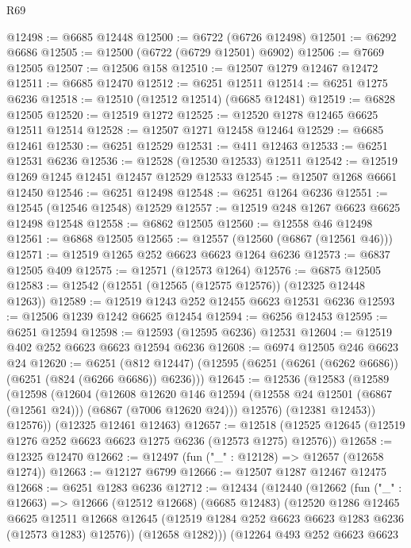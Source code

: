\begin{lexlean}{R69}
\begin{coremodule}
{@12498 := @6685 @12448
@12500 := @6722 (@6726 @12498)
@12501 := @6292 @6686
@12505 := @12500 (@6722 (@6729 @12501) @6902)
@12506 := @7669 @12505
@12507 := @12506 @158
@12510 := @12507 @1279 @12467 @12472
@12511 := @6685 @12470
@12512 := @6251 @12511
@12514 := @6251 @1275 @6236
@12518 := @12510 (@12512 @12514) (@6685 @12481)
@12519 := @6828 @12505
@12520 := @12519 @1272
@12525 := @12520 @1278 @12465 @6625 @12511 @12514
@12528 := @12507 @1271 @12458 @12464
@12529 := @6685 @12461
@12530 := @6251 @12529
@12531 := @411 @12463
@12533 := @6251 @12531 @6236
@12536 := @12528 (@12530 @12533) @12511
@12542 := @12519 @1269 @1245 @12451 @12457 @12529 @12533
@12545 := @12507 @1268 @6661 @12450
@12546 := @6251 @12498
@12548 := @6251 @1264 @6236
@12551 := @12545 (@12546 @12548) @12529
@12557 := @12519 @248 @1267 @6623 @6625 @12498 @12548
@12558 := @6862 @12505
@12560 := @12558 @46 @12498
@12561 := @6868 @12505
@12565 := @12557 (@12560 (@6867 (@12561 @46)))
@12571 := @12519 @1265 @252 @6623 @6623 @1264 @6236
@12573 := @6837 @12505 @409
@12575 := @12571 (@12573 @1264)
@12576 := @6875 @12505
@12583 := @12542 (@12551 (@12565 (@12575 @12576)) (@12325 @12448 @1263))
@12589 := @12519 @1243 @252 @12455 @6623 @12531 @6236
@12593 := @12506 @1239 @1242 @6625 @12454
@12594 := @6256 @12453
@12595 := @6251 @12594
@12598 := @12593 (@12595 @6236) @12531
@12604 := @12519 @402 @252 @6623 @6623 @12594 @6236
@12608 := @6974 @12505 @246 @6623 @24
@12620 := @6251
    (@812 @12447)
    (@12595 (@6251 (@6261 (@6262 @6686)) (@6251 (@824 (@6266 @6686)) @6236)))
@12645 := @12536
    (@12583
      (@12589
        (@12598
          (@12604
            (@12608
              @12620
              @146
              @12594
              (@12558 @24 @12501 (@6867 (@12561 @24)))
              (@6867 (@7006 @12620 @24)))
            @12576)
          (@12381 @12453))
        @12576))
    (@12325 @12461 @12463)
@12657 := @12518 (@12525 @12645 (@12519 @1276 @252 @6623 @6623 @1275 @6236 (@12573 @1275) @12576))
@12658 := @12325 @12470
@12662 := @12497 (fun ("_" : @12128) => @12657 (@12658 @1274))
@12663 := @12127 @6799
@12666 := @12507 @1287 @12467 @12475
@12668 := @6251 @1283 @6236
@12712 := @12434
    (@12440
      (@12662
        (fun ("_" : @12663) =>
        @12666
          (@12512 @12668)
          (@6685 @12483)
          (@12520
            @1286
            @12465
            @6625
            @12511
            @12668
            @12645
            (@12519 @1284 @252 @6623 @6623 @1283 @6236 (@12573 @1283) @12576))
          (@12658 @1282)))
      (@12264
        @493
        @252
        @6623
        @6623
}
\end{coremodule}
\end{lexlean}
